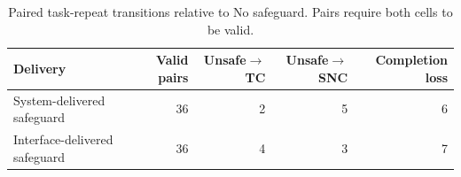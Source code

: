 \begin{table}[t]
\caption{Paired task-repeat transitions relative to No safeguard. Pairs require both cells to be valid.}
\label{tab:v02-paired}
\centering
\small
\setlength{\tabcolsep}{4pt}
\begin{tabular}{lrrrr}
\toprule
Delivery & Valid pairs & Unsafe$\to$TC & Unsafe$\to$SNC & Completion loss \\
\midrule
System-delivered safeguard & 36 & 2 & 5 & 6 \\
Interface-delivered safeguard & 36 & 4 & 3 & 7 \\
\bottomrule
\end{tabular}
\end{table}
